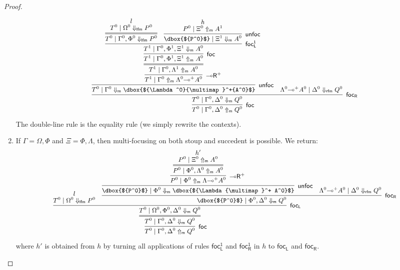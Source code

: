 \documentclass[runningheads]{llncs}
\newcommand{\lright}{{\multimap}\mathsf{R}}
\newcommand{\lolliR}{\lright}
\newcommand{\lolli}{\multimap}
\newcommand{\lfm}{\dn_\mathsf{lfm}}%
\newcommand{\rfm}{\dn_\mathsf{rfm}}%
\newcommand{\green}[1]{{#1^0}}
\newcommand{\dn}{\Downarrow}
\newcommand{\upm}{\Uparrow_{\mathsf{m}}}
\newcommand{\dnm}{\Downarrow_{\mathsf{m}}}
\newcommand{\focL}{\mathsf{foc_L}}
\newcommand{\foc}{\mathsf{foc}}
\newcommand{\focR}{\mathsf{foc_R}}
\newcommand{\focLred}{\mathsf{foc_L^1}}
\newcommand{\focRred}{\mathsf{foc_R^1}}
\newcommand{\unfoc}{\mathsf{unfoc}}
\begin{document}
\begin{proof}
\begin{enumerate}
    \[\small
    \infer[\foc]{\green{T} \mid \green{\Gamma},\green{\Delta} \upm \green{Q}}{
      \infer[\focR]{\green{T} \mid \green{\Gamma},\green{\Delta} \dnm \green{Q}}{
        \infer[\unfoc]{\green{T} \mid \green{\Gamma} \dnm \dbox{$\green{\Lambda}{\lolli}^+\green{A}$}}{
          \infer[\lolliR^+]{T^1 \mid \green{\Gamma} \upm \green{\Lambda}{\lolli}^+\green{A}}{
            \infer={T^1 \mid \green{\Gamma},\Lambda^1 \upm \green{A}}{
              \infer[\foc]{T^1 \mid \green{\Gamma},\Phi^1,\Xi^1\upm \green{A}}{
                \infer[\focLred]{T^1 \mid \green{\Gamma},\Phi^1,\Xi^1 \dnm \green{A}}{
                  \infer={\green{T} \mid \green{\Gamma},\green{\Phi} \lfm \green{P}}{
                    \deduce{\green{T} \mid \green{\Omega} \lfm \green{P}}{l}
                  }
                  &
                  \infer[\unfoc]{\dbox{$\green{P}$} \mid \Xi^1 \dnm \green{A}}{
                    \deduce{\green{P} \mid \green{\Xi} \upm A^1}{h}
                  }
                }
              }
            }            
          }
        }
        &
        \green{\green{\Lambda}{\lolli}^+ A} \mid \green{\Delta} \rfm \green{Q}
      }
    }
    \]
    The double-line rule is the equality rule (we simply rewrite the contexts).    
  \item If $\Gamma = \Omega,\Phi$ and $\Xi = \Phi, \Lambda$, then multi-focusing on both stoup and succedent is possible. We return:
    \[\small
    \infer[\foc]{\green{T} \mid \green{\Gamma},\green{\Delta} \upm \green{Q}}{
      \infer={\green{T} \mid \green{\Gamma} ,\green{\Delta} \dnm \green{Q}}{
        \infer[\focL]{\green{T} \mid \green{\Omega},\green{\Phi},\green{\Delta} \dnm \green{Q}}{
          \deduce{\green{T} \mid \green{\Omega} \lfm \green{P}}{l}
          &
          \infer[\focR]{\dbox{$\green{P}$} \mid \green{\Phi},\green{\Delta} \dnm \green{Q}}{
            \infer[\unfoc]{\dbox{$\green{P}$} \mid \green{\Phi} \dnm \dbox{$\green{\Lambda{\lolli}^+ A}$}}{
              \infer[\lolliR^+]{\green{P} \mid \green{\Phi} \upm \green{\Lambda{\lolli}^+ A}}{
                \infer={\green{P} \mid \green{\Phi}, \green{\Lambda}\upm \green{A}}{
                \deduce{\green{P} \mid \green{\Xi}\upm \green{A}}{h'}
                }
              }
            }
            &
            \green{\green{\Lambda}{\lolli}^+ A} \mid \green{\Delta} \rfm \green{Q}
          }
        }
      }
    }
    \]
where $h'$ is obtained from $h$ by turning all applications of rules $\focLred$ and $\focRred$ in $h$ to $\focL$ and $\focR$.
  \end{enumerate}
\end{proof}
\end{document}
